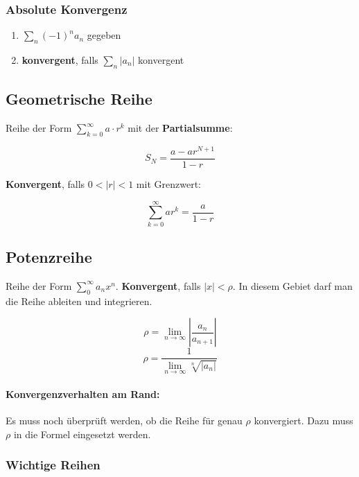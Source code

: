 \subsubsection*{Absolute Konvergenz}

\begin{enumerate}
	\item $\sum_n (-1)^n a_n$ gegeben
	\item \textbf{konvergent}, falls $\sum_n |a_n|$ konvergent
\end{enumerate}

\subsection{Geometrische Reihe}

Reihe der Form $\sum^\infty_{k = 0} a \cdot r^k$ mit der \textbf{Partialsumme}:

\begin{equation*}
	S_N=\frac{a-ar^{N+1}}{1-r}
\end{equation*}

\textbf{Konvergent}, falls $0<|r|<1$ mit Grenzwert:

\begin{equation*}
	\sum^\infty_{k=0}ar^k=\frac{a}{1-r}
\end{equation*}

\subsection{Potenzreihe}

Reihe der Form $\sum^\infty_0 a_nx^n$. \textbf{Konvergent}, falls $|x|<\rho$. In diesem Gebiet darf man die Reihe ableiten und integrieren.

\begin{equation*}
	\rho= \lim_{n\rightarrow \infty}|\frac{a_n}{a_{n+1}}|
\end{equation*}
\begin{equation*}
	\rho=\frac{1}{\lim_{n\rightarrow \infty}\sqrt[n]{|a_n|}}
\end{equation*}

\paragraph{Konvergenzverhalten am Rand:} Es muss noch {\"u}berpr{\"u}ft werden, ob die Reihe f{\"u}r genau $\rho$ konvergiert. Dazu muss $\rho$ in die Formel eingesetzt werden.

\subsubsection{Wichtige Reihen}

